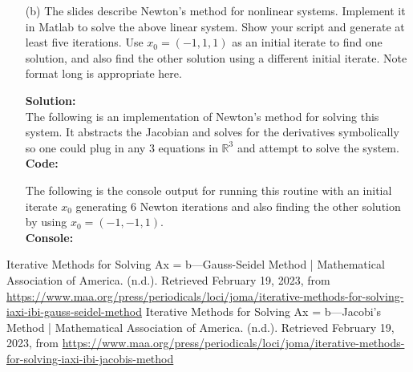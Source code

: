 \documentclass[12pt]{article}
\makeatletter
\theoremstyle{homework}
\newenvironment{exercise}[1]
{\def\@currentlabel{#1}\exercisecore}
{\endexercisecore}
\newcommand{\localhead}[1]{\par\smallskip\noindent\textbf{#1}\nobreak\\}%
\newcommand\solution{\localhead{Solution:}}
\newcommand{\Reals}{\ensuremath{\mathbb R}}
\let\RR\Reals
\makeatother
\begin{document}
\begin{exercise}{Problem P17}
\begin{enumerate}
    \item[(b)] The slides describe Newton's method for nonlinear systems. Implement it in Matlab to solve the 
    above linear system. Show your script and generate at least five iterations. Use $x_0 = (-1, 1, 1)$ as an initial iterate
    to find one solution, and also find the other solution using a different initial iterate. Note format long is appropriate here. 
    \solution The following is an implementation of Newton's method for solving this system. It abstracts the Jacobian and solves for the 
    derivatives symbolically so one could plug in any 3 equations in $\RR^3$ and attempt to solve the system. \\
    
    \textbf{Code:}
    \begin{center}
      
    \end{center}

    The following is the console output for running this routine with an initial iterate $x_0$ generating 6 Newton iterations and also finding the other solution 
    by using $x_0 = (-1, -1, 1)$.\\


    \textbf{Console:}
    \begin{center}
      
    \end{center}   






  \end{enumerate}
  
\end{exercise}











\begin{thebibliography}{1}  %
  Iterative Methods for Solving Ax = b—Gauss-Seidel Method | Mathematical Association of America. (n.d.). Retrieved February 19, 2023, from \href{https://www.maa.org/press/periodicals/loci/joma/iterative-methods-for-solving-iaxi-ibi-gauss-seidel-method}{https://www.maa.org/press/periodicals/loci/joma/iterative-methods-for-solving-iaxi-ibi-gauss-seidel-method}
  Iterative Methods for Solving Ax = b—Jacobi’s Method | Mathematical Association of America. (n.d.). Retrieved February 19, 2023, from \href{https://www.maa.org/press/periodicals/loci/joma/iterative-methods-for-solving-iaxi-ibi-jacobis-method}{https://www.maa.org/press/periodicals/loci/joma/iterative-methods-for-solving-iaxi-ibi-jacobis-method}
  \end{thebibliography}
\end{document}
